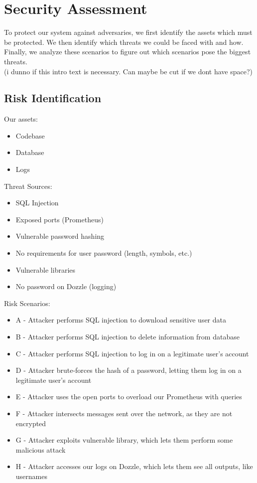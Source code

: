 \section{Security Assessment}
To protect our system against adversaries, we first identify the assets which must be protected. We then identify which threats we could be faced with and how. Finally, we analyze these scenarios to figure out which scenarios pose the biggest threats.\\
(i dunno if this intro text is necessary. Can maybe be cut if we dont have space?)

\subsection{Risk Identification}
Our assets:
\begin{itemize}
    \item Codebase
    \item Database
    \item Logs
\end{itemize}

Threat Sources:
\begin{itemize}
    \item SQL Injection
    \item Exposed ports (Prometheus)
    \item Vulnerable password hashing
    \item No requirements for user password (length, symbols, etc.)
    \item Vulnerable libraries
    \item No password on Dozzle (logging)
\end{itemize}

Risk Scenarios:
\begin{itemize}
    \item A - Attacker performs SQL injection to download sensitive user data
    \item B - Attacker performs SQL injection to delete information from database
    \item C - Attacker performs SQL injection to log in on a legitimate user's account
    \item D - Attacker brute-forces the hash of a password, letting them log in on a legitimate user's account
    \item E - Attacker uses the open ports to overload our Prometheus with queries
    \item F - Attacker intersects messages sent over the network, as they are not encrypted
    \item G - Attacker exploits vulnerable library, which lets them perform some malicious attack
    \item H - Attacker accesses our logs on Dozzle, which lets them see all outputs, like usernames
\end{itemize}

